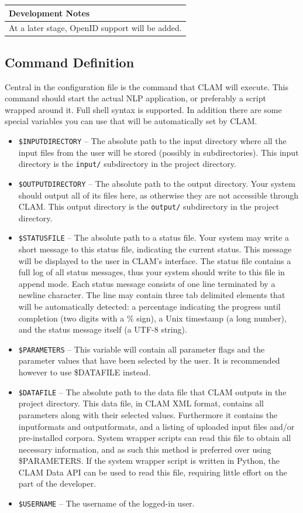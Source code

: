 \documentclass[a4paper,12pt]{report}
\newenvironment{devnotes}
{\newpage
\begin{center}
    \begin{tabular}[h!]{|p{0.8\textwidth}|}
    \hline
    {\bf Development Notes}\\\hline}
{   \\\hline
    \end{tabular}
\end{center}}
\begin{document}
\begin{devnotes}
At a later stage, OpenID support will be added.
\end{devnotes}


\subsection{Command Definition}
\label{sec:command}

Central in the configuration file is the command that CLAM will execute. This command should start the actual NLP application, or preferably a script wrapped around it. Full shell syntax is supported. In addition there are some special variables you can use that will be automatically set by CLAM. 

\begin{itemize}
\item \texttt{\$INPUTDIRECTORY} -- The absolute path to the input directory where all the input files from the user will be stored (possibly in subdirectories). This input directory is the \texttt{input/} subdirectory in the project directory.
\item \texttt{\$OUTPUTDIRECTORY} -- The absolute path to the output directory. Your system should output all of its files here, as otherwise they are not accessible through CLAM.  This output directory is the \texttt{output/} subdirectory in the project directory.
\item \texttt{\$STATUSFILE} -- The absolute path to a status file. Your system may write a short message to this status file, indicating the current status. This message will be displayed to the user in CLAM's interface. The status file contains a full log of all status messages, thus your system should write to this file in append mode. Each status message consists of one line terminated by a newline character. The line may contain three tab delimited elements that will be automatically detected: a percentage indicating the progress until completion (two digits with a \% sign), a Unix timestamp (a long number), and the status message itself (a UTF-8 string).
\item \texttt{\$PARAMETERS} -- This variable will contain all parameter flags and the parameter values that have been selected by the user. It is recommended however to use \$DATAFILE instead.  
\item \texttt{\$DATAFILE} -- The absolute path to the data file that CLAM outputs in the project directory. This data file, in CLAM XML format, contains all parameters along with their selected values. Furthermore it contains the inputformats and outputformats, and a listing of uploaded input files and/or pre-installed corpora. System wrapper scripts can read this file to obtain all necessary information, and as such this method is preferred over using \$PARAMETERS. If the system wrapper script is written in Python, the CLAM Data API can be used to read this file, requiring little effort on the part of the developer. 
\item \texttt{\$USERNAME} -- The username of the logged-in user.
\end{itemize}
\end{document}
